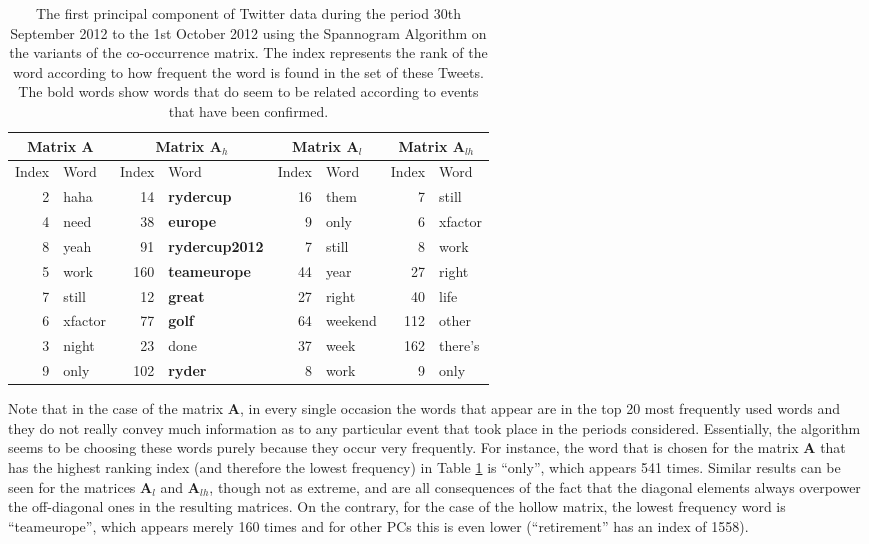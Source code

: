 \documentclass[graybox]{svmult}
\newcommand{\covmat}{\mathbf{A}}
\begin{document}
\begin{table}[H]
\center
\begin{tabular}{| r | l | r | l| r | l | r | l|}
\hline
\multicolumn{2}{|c|}{Matrix $\covmat$ }& \multicolumn{2}{|c|}{Matrix $\covmat_h$}& \multicolumn{2}{|c|}{Matrix $\covmat_l$} & \multicolumn{2}{|c|}{Matrix $\covmat_{lh}$} \\

\hline
Index & Word &Index & Word & Index & Word & Index & Word\\
\hline
2 & haha & 14 & \textbf{rydercup} & 16 & them& 7 & still\\
4 & need  & 38 & \textbf{europe} & 9 & only &  6 & xfactor\\
8 & yeah &91 & \textbf{rydercup2012}& 7 & still  & 8 & work \\

5 & work & 160 & \textbf{teameurope}&44 & year  & 27 & right \\

7 & still &  12 & \textbf{great}&27 & right   & 40 & life\\

6 & xfactor & 77 & \textbf{golf}  &64& weekend & 112 & other  \\ 

3 & night &23 & done & 37 & week & 162 & there's\\
 
9 & only & 102 & \textbf{ryder}  & 8 & work & 9 & only\\

\hline
\end{tabular}

\caption{The first principal component of Twitter data during the period 30th September 2012 to the 1st October 2012 using the Spannogram Algorithm on the variants of the co-occurrence matrix. The index represents the rank of the word according to how frequent the word is found in the set of these Tweets. The bold words show words that do seem to be related according to events that have been confirmed.}
\label{pcs_ryder}
\end{table}


Note that in the case of the matrix $\covmat$, in every single occasion the words that appear are in the top 20 most frequently used words and they do not really convey much information as to any particular event that took place in the periods considered. Essentially, the algorithm seems to be choosing these words purely because they occur very frequently. For instance, the word that is chosen for the matrix $\covmat$ that has the highest ranking index (and therefore the lowest frequency) in Table \ref{pcs_ryder} is ``only'', which appears 541 times. Similar results can be seen for the matrices $\covmat_l$ and $\covmat_{lh}$, though not as extreme, and are all consequences of the fact that the diagonal elements always overpower the off-diagonal ones in the resulting matrices. On the contrary, for the case of the hollow matrix, the lowest frequency word is ``teameurope'', which appears merely 160 times and for other PCs this is even lower (``retirement'' has an index of 1558). 
\end{document}
